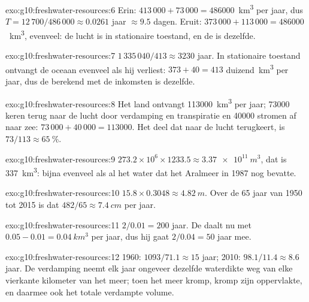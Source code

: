 \begin{solution}{exo:g10:freshwater-resources:6}
Erin: $413\,000 + 73\,000 = \num{486000}$~\unit{km^3} per jaar, dus
$T = 12\,700/486\,000 \approx \num{0.0261}$ jaar $\approx \num{9.5}$ dagen.
Eruit: $373\,000 + 113\,000 = \num{486000}$~\unit{km^3}, evenveel: de lucht is in
stationaire toestand, en de  is dezelfde.
\end{solution}

\begin{solution}{exo:g10:freshwater-resources:7}
$1\,335\,040/413 \approx \num{3230}$ jaar. In stationaire toestand ontvangt de
oceaan evenveel als hij verliest: $373 + 40 = 413$ duizend~\unit{km^3} per jaar,
dus de  berekend met de inkomsten is dezelfde.
\end{solution}

\begin{solution}{exo:g10:freshwater-resources:8}
Het land ontvangt \num{113000}~\unit{km^3} per jaar; \num{73000} keren terug naar
de lucht door verdamping en transpiratie en \num{40000} stromen af naar zee:
$73\,000 + 40\,000 = \num{113000}$. Het deel dat naar de lucht terugkeert, is
$73/113 \approx \qty{65}{\percent}$.
\end{solution}

\begin{solution}{exo:g10:freshwater-resources:9}
$273.2 \times 10^6 \times 1233.5 \approx \qty{3.37e11}{m^3}$, dat is
\qty{337}{km^3}: bijna evenveel als al het water dat het Aralmeer in 1987 nog
bevatte.
\end{solution}

\begin{solution}{exo:g10:freshwater-resources:10}
$15.8 \times 0.3048 \approx \qty{4.82}{m}$. Over de 65 jaar van 1950 tot
2015 is dat $482/65 \approx \qty{7.4}{cm}$ per jaar.
\end{solution}

\begin{solution}{exo:g10:freshwater-resources:11}
$2/0.01 = 200$ jaar. De  daalt nu met $0.05 - 0.01 =
\qty{0.04}{km^3}$ per jaar, dus hij gaat $2/0.04 = 50$ jaar mee.
\end{solution}

\begin{solution}{exo:g10:freshwater-resources:12}
1960: $1093/71.1 \approx 15$ jaar; 2010: $98.1/11.4 \approx 8.6$ jaar.
De verdamping neemt elk jaar ongeveer dezelfde waterdikte weg van elke vierkante
kilometer van het meer; toen het meer kromp, kromp zijn oppervlakte, en daarmee
ook het totale verdampte volume.
\end{solution}

